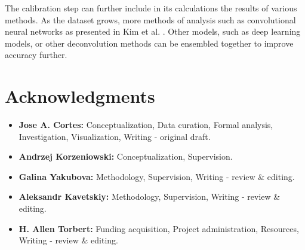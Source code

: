\documentclass[preprint, 12pt, authoryear]{elsarticle}
\begin{document}
The calibration step can further include in its calculations the results of various methods. As the dataset grows, more methods of analysis such as convolutional neural networks as presented in Kim et al. \cite{kim_deep_2025}. Other models, such as deep learning models, or other deconvolution methods can be ensembled together to improve accuracy further.

\section*{Acknowledgments}

\begin{itemize}
    \item \textbf{Jose A. Cortes:} Conceptualization, Data curation, Formal analysis, Investigation, Visualization, Writing - original draft.
    \item \textbf{Andrzej Korzeniowski:} Conceptualization, Supervision.
    \item \textbf{Galina Yakubova:} Methodology, Supervision, Writing - review \& editing.
    \item \textbf{Aleksandr Kavetskiy:} Methodology, Supervision, Writing - review \& editing.
    \item \textbf{H. Allen Torbert:} Funding acquisition, Project administration, Resources, Writing - review \& editing.
\end{itemize}




\end{document}

